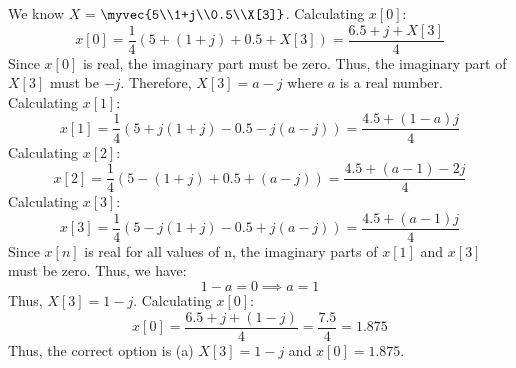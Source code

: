 \documentclass[a4paper, 12pt]{article}
\begin{document}
We know $X$ = $\myvec{5\\1+j\\0.5\\X[3]}$.
Calculating $x[0]$:
\[x[0] = \frac{1}{4} (5 + (1+j) + 0.5 + X[3]) = \frac{6.5 + j + X[3]}{4}\]
Since $x[0]$ is real, the imaginary part must be zero. Thus, the imaginary part of $X[3]$ must be $-j$. Therefore, $X[3] = a - j$ where $a$ is a real number.
Calculating $x[1]$:
\[x[1] = \frac{1}{4} (5 + j(1+j) - 0.5 - j(a - j)) = \frac{4.5 + (1 - a)j}{4}\]
Calculating $x[2]$:
\[x[2] = \frac{1}{4} (5 - (1+j) + 0.5 + (a - j)) = \frac{4.5 + (a - 1) - 2j}{4}\]
Calculating $x[3]$:
\[x[3] = \frac{1}{4} (5 - j(1+j) - 0.5 + j(a - j)) = \frac{4    .5 + (a - 1)j}{4}\]
Since $x[n]$ is real for all values of n, the imaginary parts of $x[1]$ and $x[3]$ must be zero. Thus, we have:
\[1 - a = 0 \implies a = 1\]
Thus, $X[3] = 1 - j$.
Calculating $x[0]$:
\[x[0] = \frac{6.5 + j + (1 - j)}{4} = \frac{7.5}{4} = 1.875\]
Thus, the correct option is (a) $X[3] = 1 - j$ and $x[0] = 1.875$.
\end{document}
